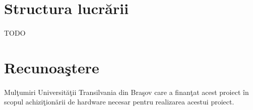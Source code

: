 \section{Structura lucr\u arii}

\paragraph{}
TODO


\section{Recunoa\c stere}

\paragraph{}
Mul\c tumiri Universit\u a\c tii Transilvania din Bra\c sov care a finan\c tat acest proiect \^ in scopul achizi\c tion\u arii de hardware necesar pentru realizarea acestui proiect.